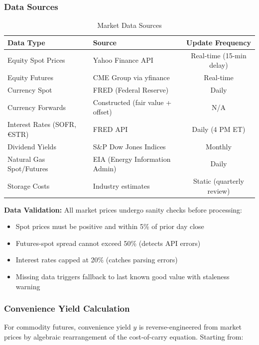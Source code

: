 \documentclass[12pt,a4paper]{article}
\begin{document}
\subsubsection{Data Sources}

\begin{table}[H]
\centering
\caption{Market Data Sources}
\label{tab:data_sources}
\begin{tabular}{@{}llc@{}}
\toprule
\textbf{Data Type} & \textbf{Source} & \textbf{Update Frequency} \\
\midrule
Equity Spot Prices & Yahoo Finance API & Real-time (15-min delay) \\
Equity Futures & CME Group via yfinance & Real-time \\
Currency Spot & FRED (Federal Reserve) & Daily \\
Currency Forwards & Constructed (fair value + offset) & N/A \\
Interest Rates (SOFR, €STR) & FRED API & Daily (4 PM ET) \\
Dividend Yields & S\&P Dow Jones Indices & Monthly \\
Natural Gas Spot/Futures & EIA (Energy Information Admin) & Daily \\
Storage Costs & Industry estimates & Static (quarterly review) \\
\bottomrule
\end{tabular}
\end{table}

\textbf{Data Validation:} All market prices undergo sanity checks before processing:
\begin{itemize}
    \item Spot prices must be positive and within 5\% of prior day close
    \item Futures-spot spread cannot exceed 50\% (detects API errors)
    \item Interest rates capped at 20\% (catches parsing errors)
    \item Missing data triggers fallback to last known good value with staleness warning
\end{itemize}

\subsubsection{Convenience Yield Calculation}

For commodity futures, convenience yield $y$ is reverse-engineered from market prices by algebraic rearrangement of the cost-of-carry equation. Starting from:
\end{document}
